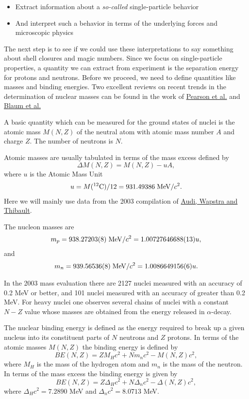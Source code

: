 \documentclass[%
twoside,                 %
final,                   %
10pt]{article}
\begin{document}
\begin{itemize}
\item Extract information about a \emph{so-called} single-particle  behavior

\item And interpret such a behavior in terms of the underlying forces and microscopic physics
\end{itemize}

\noindent
The next step is to see if we could use these interpretations to say something about shell closures and magic numbers. Since we focus on single-particle properties, a quantity we can extract from experiment is the separation energy for protons and neutrons. Before we proceed, we need to define quantities like masses and binding energies.   Two excellent reviews on 
recent trends in the determination of nuclear masses can be found in the work of \href{{http://journals.aps.org/rmp/abstract/10.1103/RevModPhys.75.1021}}{Pearson et al.} and \href{{http://iopscience.iop.org/1402-4896/2013/T152/014017/}}{Blaum et al.}


A basic quantity which can be measured for the ground states of nuclei is the atomic mass $M(N, Z)$ of the neutral atom with atomic mass number $A$ and charge $Z$. The number of neutrons is $N$.

Atomic masses are usually tabulated in terms of the mass excess defined by
\[
\Delta M(N, Z) =  M(N, Z) - uA,
\]
where $u$ is the Atomic Mass Unit 
\[
u = M(^{12}\mathrm{C})/12 = 931.49386 \hspace{0.1cm} \mathrm{MeV}/c^2.
\]
Here we will mainly use 
data from the 2003 compilation of \href{{http://www.sciencedirect.com/science/journal/03759474/729/1}}{Audi, Wapstra and Thibault}.


The nucleon masses are
\[
m_p = 938.27203(8)\hspace{0.1cm} \mathrm{MeV}/c^2 = 1.00727646688(13)u,
\] 
and
\[
m_n = 939.56536(8)\hspace{0.1cm} \mathrm{MeV}/c^2 = 1.0086649156(6)u.
\]

In the 2003 mass evaluation there are 2127 nuclei measured with an accuracy of 0.2
MeV or better, and 101 nuclei measured with an accuracy of greater than 0.2 MeV. For
heavy nuclei one observes several chains of nuclei with a constant $N-Z$ value whose masses are obtained from the energy released in $\alpha$-decay.


The nuclear binding energy is defined as the energy required to break up a given nucleus
into its constituent parts of $N$ neutrons and $Z$ protons. In terms of the atomic masses $M(N, Z)$ the binding energy is defined by
\[
BE(N, Z) = ZM_H c^2 + Nm_n c^2 - M(N, Z)c^2 ,
\]
where $M_H$ is the mass of the hydrogen atom and $m_n$ is the mass of the neutron.
In terms of the mass excess the binding energy is given by
\[
BE(N, Z) = Z\Delta_H c^2 + N\Delta_n c^2 -\Delta(N, Z)c^2 ,
\]
where $\Delta_H c^2 = 7.2890$ MeV and $\Delta_n c^2 = 8.0713$ MeV.
\end{document}
